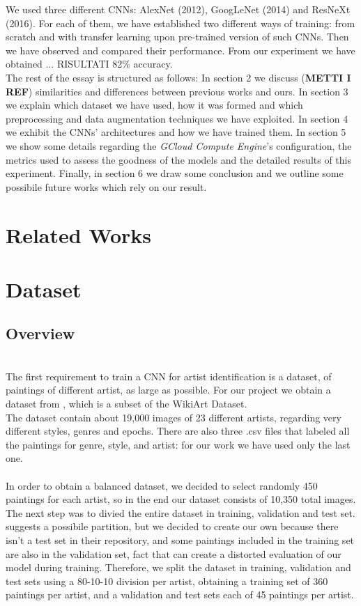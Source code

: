 \documentclass{article}
\begin{document}
We used three different CNNs: AlexNet (2012), GoogLeNet (2014) and ResNeXt (2016). For each of them, we have established two different ways of training: from scratch and with transfer learning  upon pre-trained version of such CNNs. Then we have observed and compared their performance. From our experiment we have obtained ... RISULTATI 82\% accuracy.\\

The rest of the essay is structured as follows: In section 2 we discuss (\textbf{METTI I REF}) similarities and differences between previous works and ours. In section 3 we explain which dataset we have used, how it was formed and which preprocessing and data augmentation techniques we have exploited. In section 4 we exhibit the CNNs' architectures and how we have trained them. In section 5 we show some details regarding the \textit{GCloud Compute Engine}'s configuration, the metrics used to assess the goodness of the models and the detailed results of this experiment. Finally, in section 6 we draw some conclusion and we outline some possibile future works which rely on our result.


\section{Related Works}


\section{Dataset}\label{dataset}
\subsection{Overview}\mbox{}\\
The first requirement to train a CNN for artist identification is a dataset, of paintings of different artist, as large as possible. For our project we obtain a dataset from \cite{ArtGANDataset}, which is a subset of the WikiArt Dataset. \\
The dataset contain about 19,000 images of 23 different artists, regarding very different styles, genres  and epochs. There are also three .csv files that labeled all the paintings for genre, style, and artist: for our work we have used only the last one.\\ \\
In order to obtain a balanced dataset, we decided to select randomly 450 paintings for each artist, so in the end our dataset consists of 10,350 total images. \\
The next step was to divied the entire dataset in training, validation and test set. \cite{ArtGANDataset} suggests a possibile partition, but we decided to create our own because there isn't a test set in their repository, and some paintings included in the training set are also in the validation set, 
fact that can create a distorted evaluation of our model during training. Therefore, we split the dataset in training, validation and test sets using a 80-10-10 division per artist, obtaining a training set of 360 paintings per artist, and a validation and test sets each of 45 paintings per artist.
\end{document}
